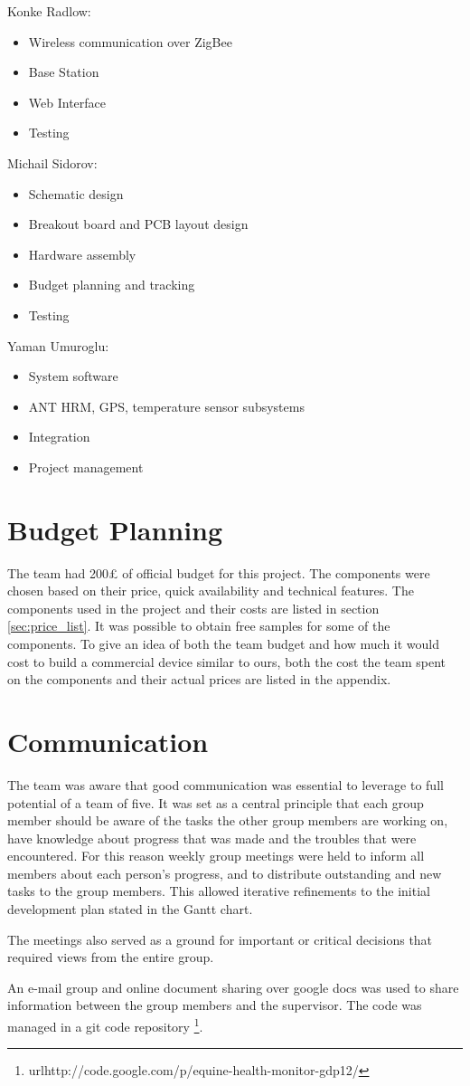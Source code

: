 Konke Radlow:
\begin{itemize}
\item Wireless communication over ZigBee
\item Base Station
\item Web Interface
\item Testing
\end{itemize}

Michail Sidorov:
\begin{itemize}
\item Schematic design
\item Breakout board and PCB layout design
\item Hardware assembly
\item Budget planning and tracking
\item Testing
\end{itemize}

Yaman Umuroglu: 
\begin{itemize}
\item System software
\item ANT HRM, GPS, temperature sensor subsystems
\item Integration
\item Project management 
\end{itemize}


\section{Budget Planning}
The team had 200£ of official budget for this project. The components were chosen based on their price, quick availability and technical features. The components used in the project and their costs are listed in section \ref{sec:price_list}. It was possible to obtain free samples for some of the components. To give an idea of both the team budget and how much it would cost to build a commercial device similar to ours, both the cost the team spent on the components and their actual prices are listed in the appendix.


\section{Communication}
The team was aware that good communication was essential to leverage to full potential of a team of five. It was set as a central principle that each group member should be aware of the tasks the other group members are working on, have knowledge about progress that was made and the troubles that were encountered. For this reason weekly group meetings were held to inform all members about each person's progress, and to distribute outstanding and new tasks to the group members. This allowed iterative refinements to the initial development plan stated in the Gantt chart.

The meetings also served as a ground for important or critical decisions that required views from the entire group.

An e-mail group and online document sharing over google docs was used to share information between the group members and the supervisor. The code was managed in a git code repository \footnote{url{http://code.google.com/p/equine-health-monitor-gdp12/}}.